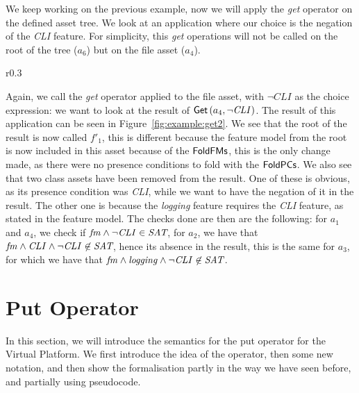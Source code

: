 \begin{example}\label{example:getoperator}
We keep working on the previous example, now we will apply the \emph{get}
operator on the defined asset tree. We look at an application where our choice is the
negation of the \emph{CLI} feature. For simplicity, this \emph{get} operations will
not be called on the root of the tree ($a_6$) but on the file asset ($a_4$).
\end{example}
\begin{wrapfigure}{r}{0.3\textwidth}
  \centering
  \caption{Example application of the \emph{get} operator with a non-trivial choice.}
  \label{fig:example:get2}
\end{wrapfigure}
Again, we call the \emph{get} operator applied to the file asset, with \(\neg\mathit{CLI}\)
as the choice expression: we want to look at the result of \({\sf Get}\left(a_4, \neg\mathit{CLI}\right)\).
The result of this application can be seen in Figure~\ref{fig:example:get2}. We see that
the root of the result is now called $f'_1$, this is different because the feature model from
the root is now included in this asset because of the \({\sf FoldFMs}\), this is the only change
made, as there were no presence conditions to fold with the \({\sf FoldPCs}\). We also
see that two class assets have been removed from the result. One of these is
obvious, as its presence condition was \emph{CLI}, while we want to have the
negation of it in the result. The other one is because the \emph{logging} feature
requires the \emph{CLI} feature, as stated in the feature model. The checks done are
then are the following: for $a_1$ and $a_4$, we check if \( \mathit{fm} \land \neg\mathit{CLI} \in \textit{SAT} \),
for $a_2$, we have that \( \mathit{fm} \land \mathit{CLI} \land \neg\mathit{CLI} \not\in \textit{SAT} \),
hence its absence in the result, this is the same for $a_3$, for which we have that \(\mathit{fm} \land \mathit{logging} \land \neg\mathit{CLI} \not\in \textit{SAT}\).

\section{Put Operator}\label{sec:vp:putoperator}
In this section, we will introduce the semantics for the put operator for the
Virtual Platform. We first introduce the idea of the operator, then some new 
notation, and then show the formalisation partly in the way we have seen 
before, and partially using pseudocode.

